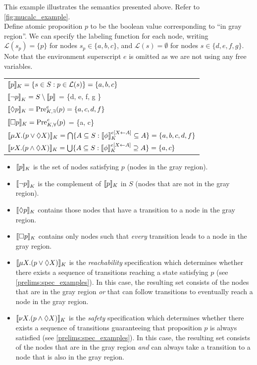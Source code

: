 \begin{exmp}\label{mucalc_example}
This example illustrates the semantics presented above. Refer to \autoref{fig:mucalc_example}.\\
Define atomic proposition $p$ to be the boolean value corresponding to ``in gray region''. We can specify the labeling function for each node, writing $\mathcal{L}(s_p) = \{p\}$ for nodes $s_p \in \{a, b, c\}$, and $\mathcal{L}(s) = \emptyset$ for nodes $s \in \{d, e, f, g \}$. Note that the environment superscript $e$ is omitted as we are not using any free variables.

\begin{tabular}{l}\label{table:modal_mucalc_syntax}
    ${\llbracket}{} p {\rrbracket}{}_K = \{s \in S : p \in \mathcal{L}(s) \} = \{a, b, c\}$ \\    
    ${\llbracket} \lnot p {\rrbracket}_K = S \setminus {\llbracket} p {\rrbracket}$ = \{d, e, f, g \} \\
    ${\llbracket}{} \Diamond p {\rrbracket}{}_K = \text{Pre}_{K,\exists}^{e} (p) = \{a, c, d, f\}$ \\
    ${\llbracket}{} \square p {\rrbracket}{}_K = \text{Pre}_{K,\forall}^e (p)$ = \{a, c\} \\
    ${\llbracket}{} \mu X.(p \lor \Diamond X) {\rrbracket}{}_K = \bigcap \{ A \subseteq S : {\llbracket}{} \phi {\rrbracket}{}_K^{e[X \leftarrow A]} \subseteq A \} = \{ a,b,c,d,f \}$ \\
    ${\llbracket}{} \nu X.(p \land \Diamond X) {\rrbracket}{}_K = \bigcup \{ A \subseteq S : {\llbracket}{} \phi {\rrbracket}{}_K^{e[X \leftarrow A]} \supseteq A \} = \{ a, c \}$
\end{tabular}

\begin{itemize}
    \item ${\llbracket}{} p {\rrbracket}{}_K$ is the set of nodes satisfying $p$ (nodes in the gray region).
    \item ${\llbracket} \lnot p {\rrbracket}_K$ is the complement of ${\llbracket}{} p {\rrbracket}{}_K$ in $S$ (nodes that are not in the gray region).
    \item ${\llbracket}{} \Diamond p {\rrbracket}{}_K$ contains those nodes that have a transition to a node in the gray region.
    \item ${\llbracket}{} \square p {\rrbracket}{}_K$ contains only nodes such that \emph{every} transition leads to a node in the gray region.
    \item ${\llbracket}{} \mu X.(p \lor \Diamond X) {\rrbracket}{}_K$ is the \emph{reachability} specification which determines whether there exists a sequence of transitions reaching a state satisfying $p$ (see \autoref{prelims:spec_examples}). In this case, the resulting set consists of the nodes that are in the gray region \emph{or} that can follow transitions to eventually reach a node in the gray region.
    \item ${\llbracket}{} \nu X.(p \land \Diamond X) {\rrbracket}{}_K$ is the \emph{safety} specification which determines whether there exists a sequence of transitions guaranteeing that proposition $p$ is always satisfied (see \autoref{prelims:spec_examples}). In this case, the resulting set consists of the nodes that are in the gray region \emph{and} can always take a transition to a node that is also in the gray region. 
\end{itemize}
\end{exmp}

